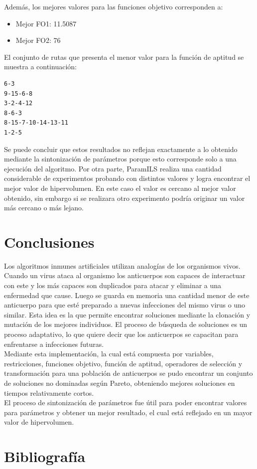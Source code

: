 \documentclass{llncs}
\begin{document}
Además, los mejores valores para las funciones objetivo corresponden a:
\begin{itemize}
\item Mejor FO1: 11.5087
\item Mejor FO2: 76
\end{itemize}

\newpage
El conjunto de rutas que presenta el menor valor para la función de aptitud se muestra a continuación:
\begin{verbatim}
6-3
9-15-6-8
3-2-4-12
8-6-3
8-15-7-10-14-13-11
1-2-5
\end{verbatim}

Se puede concluir que estos resultados no reflejan exactamente a lo obtenido mediante la sintonización de parámetros porque esto corresponde solo a una ejecución del algoritmo. Por otra parte, ParamILS realiza una cantidad considerable de experimentos probando con distintos valores y logra encontrar el mejor valor de hipervolumen. En este caso el valor es cercano al mejor valor obtenido, sin embargo si se realizara otro experimento podría originar un valor más cercano o más lejano.

\section{Conclusiones}

Los algoritmos inmunes artificiales utilizan analogías de los organismos vivos. Cuando un virus ataca al organismo los anticuerpos son capaces de interactuar con este y los más capaces son duplicados para atacar y eliminar a una enfermedad que cause. Luego se guarda en memoria una cantidad menor de este anticuerpo para que esté preparado a nuevas infecciones del mismo virus o uno similar. Esta idea es la que permite encontrar soluciones mediante la clonación y mutación de los mejores individuos. El proceso de búsqueda de soluciones es un proceso adaptativo, lo que quiere decir que los anticuerpos se capacitan para enfrentarse a infecciones futuras. \\

Mediante esta implementación, la cual está compuesta por variables, restricciones, funciones objetivo, función de aptitud, operadores de selección y transformación para una población de anticuerpos se pudo encontrar un conjunto de soluciones no dominadas según Pareto, obteniendo mejores soluciones en tiempos relativamente cortos. \\

El proceso de sintonización de parámetros fue útil para poder encontrar valores para parámetros y obtener un mejor resultado, el cual está reflejado en un mayor valor de hipervolumen.\\


\section{Bibliograf\'ia}


\end{document}
